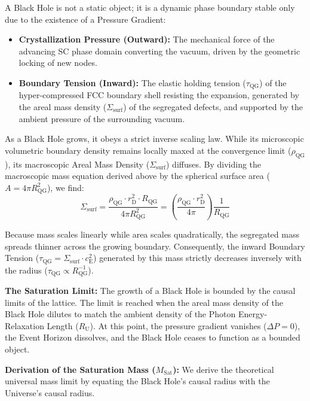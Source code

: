 A Black Hole is not a static object; it is a dynamic phase boundary stable only due to the existence of a Pressure Gradient:

\begin{itemize}
    \item \textbf{Crystallization Pressure (Outward):} The mechanical force of the advancing SC phase domain converting the vacuum, driven by the geometric locking of new nodes.
    \item \textbf{Boundary Tension (Inward):} The elastic holding tension ($\tau_{\mathrm{QG}}$) of the hyper-compressed FCC boundary shell resisting the expansion, generated by the areal mass density ($\Sigma_{\mathrm{surf}}$) of the segregated defects, and supported by the ambient pressure of the surrounding vacuum.
\end{itemize}

As a Black Hole grows, it obeys a strict inverse scaling law. While its microscopic volumetric boundary density remains locally maxed at the convergence limit ($\rho_{\mathrm{QG}}$), its macroscopic Areal Mass Density ($\Sigma_{\mathrm{surf}}$) diffuses. By dividing the macroscopic mass equation derived above by the spherical surface area ($A = 4\pi R_{\mathrm{QG}}^2$), we find:
\begin{equation}
    \Sigma_{\mathrm{surf}} = \frac{\rho_{\mathrm{QG}} \cdot r_{\mathrm{D}}^2 \cdot R_{\mathrm{QG}}}{4\pi R_{\mathrm{QG}}^2} = \left( \frac{\rho_{\mathrm{QG}} \cdot r_{\mathrm{D}}^2}{4\pi} \right) \frac{1}{R_{\mathrm{QG}}}
\end{equation}

Because mass scales linearly while area scales quadratically, the segregated mass spreads thinner across the growing boundary. Consequently, the inward Boundary Tension ($\tau_{\mathrm{QG}} = \Sigma_{\mathrm{surf}} \cdot c_{\mathrm{E}}^2$) generated by this mass strictly decreases inversely with the radius ($\tau_{\mathrm{QG}} \propto R_{\mathrm{QG}}^{-1}$).

\vspace{0.5em}
\noindent\textbf{The Saturation Limit:} The growth of a Black Hole is bounded by the causal limits of the lattice. The limit is reached when the areal mass density of the Black Hole dilutes to match the ambient density of the Photon Energy-Relaxation Length ($R_{\mathrm{U}}$). At this point, the pressure gradient vanishes ($\Delta P = 0$), the Event Horizon dissolves, and the Black Hole ceases to function as a bounded object.

\vspace{0.5em}
\noindent\textbf{Derivation of the Saturation Mass ($M_{\mathrm{Sat}}$):} We derive the theoretical universal mass limit by equating the Black Hole's causal radius with the Universe's causal radius.

